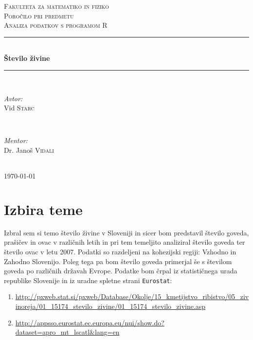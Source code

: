 \documentclass[11pt,a4paper]{article}
\begin{document}
\begin{titlepage}
\newcommand{\HRule}{\rule{\linewidth}{0.5mm}}
\center

\textsc{\LARGE Fakulteta za matematiko in fiziko}\\[3 cm]
\textsc{\Large Poročilo pri predmetu}\\[0.5cm]
\textsc{\large Analiza podatkov s programom R}\\[2 cm]
\HRule \\[0.4cm]
{ \huge \bfseries Število živine}\\[0.4cm] 
\HRule \\[6 cm]


\begin{minipage}{0.4\textwidth}
\begin{flushleft} \large
\emph{Avtor:}\\
Vid \textsc{Starc}
\end{flushleft}
\end{minipage}
~
\begin{minipage}{0.4\textwidth}
\begin{flushright} \large
\emph{Mentor:} \\
Dr. Janoš \textsc{Vidali}
\end{flushright}
\end{minipage}\\[2 cm]

{\large \today}\\[3cm] 


\end{titlepage}


\section{Izbira teme}
Izbral sem si temo število živine v Sloveniji in sicer bom predstavil število goveda, prašičev in ovac v različnih letih in pri tem temeljito analiziral število goveda ter število ovac v letu 2007. Podatki so razdeljeni na kohezijski regiji: Vzhodno in Zahodno Slovenijo. Poleg tega pa bom število goveda primerjal še s številom goveda po različnih državah Evrope. Podatke bom črpal iz statističnega urada republike Slovenije in iz uradne spletne strani \verb|Eurostat|:
\begin{enumerate}
\item \url{http://pxweb.stat.si/pxweb/Database/Okolje/15_kmetijstvo_ribistvo/05_zivinoreja/01_15174_stevilo_zivine/01_15174_stevilo_zivine.asp}

\item \url{http://appsso.eurostat.ec.europa.eu/nui/show.do?dataset=apro_mt_lscatl&lang=en}

\end{enumerate}
\end{document}
